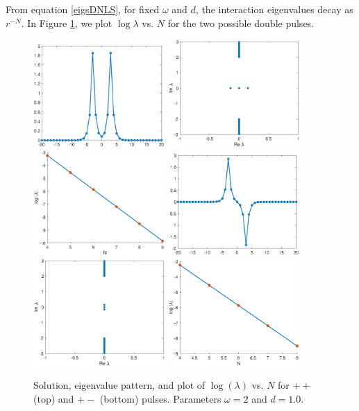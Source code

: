 \documentclass[12pt]{article}
\begin{document}
From equation \eqref{eigsDNLS}, for fixed $\omega$ and $d$, the interaction eigenvalues decay as $r^{-N}$. In Figure \ref{fig:eigendecay1}, we plot $\log \lambda$ vs. $N$ for the two possible double pulses.
\begin{figure}[H]
\centering
\includegraphics[width=5cm]{dnlsPP.eps}
\includegraphics[width=5cm]{dnlsPPeig.eps}
\includegraphics[width=5cm]{dnlsPPdecay.eps}
\includegraphics[width=5cm]{dnlsPM.eps}
\includegraphics[width=5cm]{dnlsPMeig.eps}
\includegraphics[width=5cm]{dnlsPMdecay.eps}
\caption{Solution, eigenvalue pattern, and plot of $\log(\lambda)$ vs. $N$ for $++$ (top) and $+-$ (bottom) pulses. Parameters $\omega = 2$ and $d = 1.0$.}
\label{fig:eigendecay1}
\end{figure}
\end{document}

